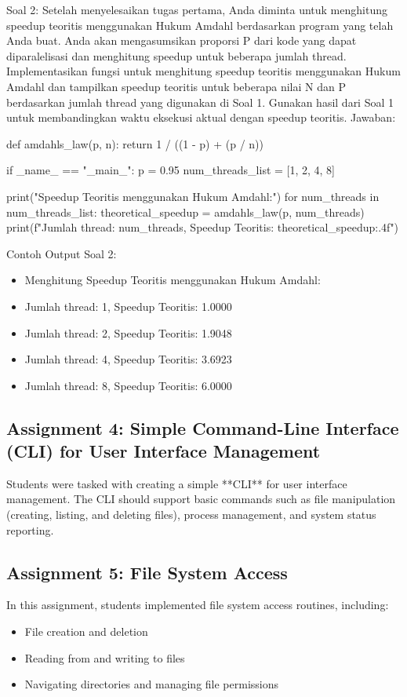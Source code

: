 \documentclass[12pt]{article}
\begin{document}
Soal 2:
Setelah menyelesaikan tugas pertama, Anda diminta untuk menghitung speedup teoritis menggunakan Hukum Amdahl berdasarkan program yang telah Anda buat. Anda akan mengasumsikan proporsi 
P dari kode yang dapat diparalelisasi dan menghitung speedup untuk beberapa jumlah thread. Implementasikan fungsi untuk menghitung speedup teoritis menggunakan Hukum Amdahl dan tampilkan speedup teoritis untuk beberapa nilai 
N dan P berdasarkan jumlah thread yang digunakan di Soal 1.
Gunakan hasil dari Soal 1 untuk membandingkan waktu eksekusi aktual dengan speedup teoritis.
Jawaban:
\begin{python}
    def amdahls_law(p, n):
    return 1 / ((1 - p) + (p / n))

if _name_ == "_main_":
    p = 0.95 
    num_threads_list = [1, 2, 4, 8] 

    print("\nMenghitung Speedup Teoritis menggunakan Hukum Amdahl:")
    for num_threads in num_threads_list:
        theoretical_speedup = amdahls_law(p, num_threads)
        print(f"Jumlah thread: {num_threads}, Speedup 
        Teoritis: {theoretical_speedup:.4f}")
\end{python}
Contoh Output Soal 2:
\begin{itemize}
    \item Menghitung Speedup Teoritis menggunakan Hukum Amdahl:
    \item Jumlah thread: 1, Speedup Teoritis: 1.0000
    \item Jumlah thread: 2, Speedup Teoritis: 1.9048
    \item Jumlah thread: 4, Speedup Teoritis: 3.6923
    \item Jumlah thread: 8, Speedup Teoritis: 6.0000
\end{itemize}

\subsection{Assignment 4: Simple Command-Line Interface (CLI) for User Interface Management}
Students were tasked with creating a simple **CLI** for user interface management. The CLI should support basic commands such as file manipulation (creating, listing, and deleting files), process management, and system status reporting.

\subsection{Assignment 5: File System Access}
In this assignment, students implemented file system access routines, including:
\begin{itemize}
    \item File creation and deletion
    \item Reading from and writing to files
    \item Navigating directories and managing file permissions
\end{itemize}
\end{document}
